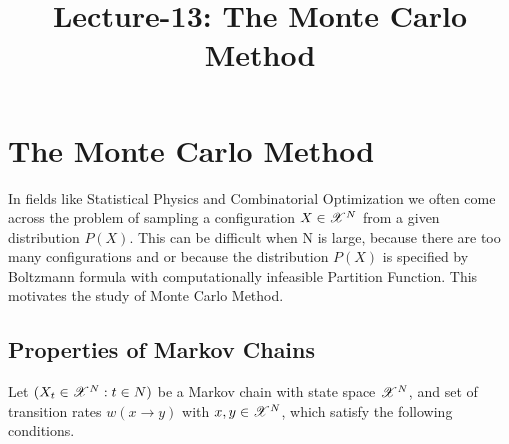 \documentclass[letterpaper,english,10pt]{article}
\title{Lecture-13: The Monte Carlo Method}
\begin{document}
\maketitle
\section{The Monte Carlo Method}
In fields like Statistical Physics and Combinatorial Optimization we often come across the problem of sampling a configuration $X \in \mathscr{X}^N$
from a given distribution $P(X)$. This can be difficult when N is large, because there are too many configurations and or because the distribution $P(X)$ is specified by Boltzmann formula with computationally infeasible Partition Function. This motivates the study of Monte Carlo Method.

\subsection{Properties of Markov Chains}
Let $(X_t \in \mathscr{X}^N:t \in N)$ be a Markov chain with state space $\mathscr{X}^N$, and set of transition rates $w(x \to y)$ with $x,y \in \mathscr{X}^N$, which satisfy the following conditions.
\end{document}
